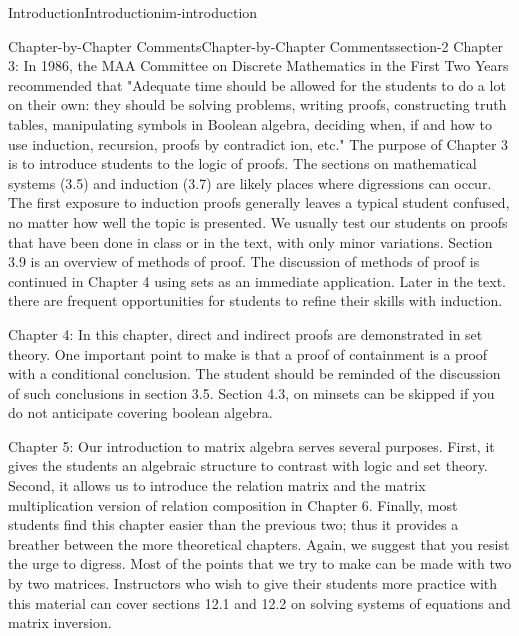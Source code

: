 \documentclass[oneside,10pt,]{book}
\begin{document}
\begin{chapterptx}{Introduction}{}{Introduction}{}{}{im-introduction}
\begin{sectionptx}{Chapter-by-Chapter Comments}{}{Chapter-by-Chapter Comments}{}{}{section-2}
Chapter 3: In 1986, the MAA Committee on Discrete Mathematics in the First Two Years recommended that "Adequate time should be allowed for the students to do a lot on their own: they should be solving problems, writing proofs, constructing truth tables, manipulating symbols in Boolean algebra, deciding when, if and how to use induction, recursion, proofs by contradict ion, etc." The purpose of Chapter 3 is to introduce students to the logic of proofs. The sections on mathematical systems (3.5) and induction (3.7) are likely places where digressions can occur. The first exposure to induction proofs generally leaves a typical student confused, no matter how well the topic is presented. We usually test our students on proofs that have been done in class or in the text, with only minor variations. Section 3.9 is an overview of methods of proof. The discussion of methods of proof is continued in Chapter 4 using sets as an immediate application. Later in the text. there are frequent opportunities for students to refine their skills with induction.%
\par
\hypertarget{p-12}{}%
Chapter 4: In this chapter, direct and indirect proofs are demonstrated in set theory. One important point to make is that a proof of containment is a proof with a conditional conclusion. The student should be reminded of the discussion of such conclusions in section 3.5. Section 4.3, on minsets can be skipped if you do not anticipate covering boolean algebra.%
\par
\hypertarget{p-13}{}%
Chapter 5: Our introduction to matrix algebra serves several purposes. First, it gives the students an algebraic structure to contrast with logic and set theory. Second, it allows us to introduce the relation matrix and the matrix multiplication version of relation composition in Chapter 6. Finally, most students find this chapter easier than the previous two; thus it provides a breather between the more theoretical chapters. Again, we suggest that you resist the urge to digress. Most of the points that we try to make can be made with two by two matrices. Instructors who wish to give their students more practice with this material can cover sections 12.1 and 12.2 on solving systems of equations and matrix inversion.%
\par
\hypertarget{p-14}{}%

\end{sectionptx}
\end{chapterptx}
\end{document}

